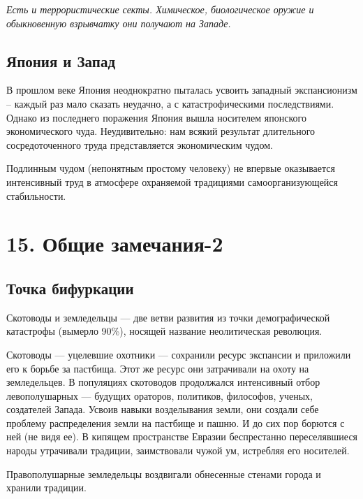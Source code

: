 \documentclass[a4paper]{article}
\begin{document}
{\itshape
Есть и террористические секты. Химическое, биологическое оружие и обыкновенную взрывчатку они получают на Западе.}

\subsection[Япония и Запад]{ Япония и Запад}
{
В прошлом веке Япония неоднократно пыталась усвоить западный экспансионизм – каждый раз мало сказать неудачно, а с
катастрофическими последствиями. Однако из последнего поражения Япония вышла носителем {\textquotedbl}японского
экономического чуда{\textquotedbl}. Неудивительно: нам всякий результат длительного сосредоточенного труда
представляется {\textquotedbl}экономическим чудом{\textquotedbl}. }

{
Подлинным чудом (непонятным {\textquotedbl}простому человеку{\textquotedbl}) не впервые оказывается интенсивный труд в
атмосфере охраняемой традициями самоорганизующейся стабильности.}


\bigskip

\section[15. Общие замечания{}-2 ]{ 15. Общие замечания-2 }
\subsection[Точка бифуркации]{ Точка бифуркации}
{
Скотоводы и земледельцы — две ветви развития из точки демографической катастрофы (вымерло 90\%), носящей название
{\textquotedbl}неолитическая революция{\textquotedbl}. }

{
Скотоводы — уцелевшие охотники — сохранили ресурс экспансии и приложили его к борьбе за пастбища. Этот же ресурс они
затрачивали на охоту на земледельцев. В популяциях скотоводов продолжался интенсивный отбор левополушарных — будущих
ораторов, политиков, философов, ученых, создателей Запада. Усвоив навыки возделывания земли, они создали себе проблему
распределения земли на пастбище и пашню. И до сих пор борются с ней (не видя ее). В кипящем пространстве Евразии
беспрестанно переселявшиеся народы утрачивали традиции, заимствовали {\textquotedbl}чужой ум{\textquotedbl}, истребляя
его носителей. }

{
Правополушарные земледельцы воздвигали обнесенные стенами города и хранили традиции. }
\end{document}
